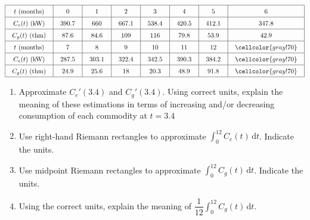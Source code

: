  \begin{align*}
    \arraycolsep=11pt\def\arraystretch{1.5}
    \begin{array}{|c|c|c|c|c|c|c|c|}
        \hline
        t \text{ (months)} & 0 & 1 & 2 & 3 & 4 & 5 & 6 \\ \hline
        C_e(t) \text{ (kW)} & 390.7 & 660 & 667.1 & 538.4 & 420.5 & 412.1 & 347.8 \\ \hline
        C_g(t) \text{ (thm)} & 87.6 & 84.6 & 109 & 116 & 79.8 & 53.9 & 42.9 \\ \hline
        t \text{ (months)} & 7 & 8 & 9 & 10 & 11 & 12 & \cellcolor{gray!70} \\ \hline
        C_e(t) \text{ (kW)} & 287.5 & 303.1 & 322.4 & 342.5 & 390.3 & 384.2 & \cellcolor{gray!70} \\ \hline
        C_g(t) \text{ (thm)} & 24.9 & 25.6 & 18 & 20.3 & 48.9 & 91.8 & \cellcolor{gray!70} \\
        \hline
    \end{array}
\end{align*}
\begin{enumerate}[label=\hspace{11pt}(\alph*), align=left, leftmargin=*, labelsep=0.25em]
    \item Approximate $C_e'(3.4)$ and $C_g'(3.4)$. Using correct units, explain the meaning of these estimations in terms of increasing and/or decreasing consumption of each commodity at $t = 3.4$
    \item Use right-hand Riemann rectangles to approximate $\int_0^{12} C_e(t) \,\mathrm{d}t$. Indicate the units. 
    \item Use midpoint Riemann rectangles to approximate $\int_0^{12} C_g(t) \,\mathrm{d}t$. Indicate the units.
    \item Using the correct units, explain the meaning of $\dfrac{1}{12}\int_0^{12} C_g(t) \,\mathrm{d}t$.
\end{enumerate} \vspace{11pt}

